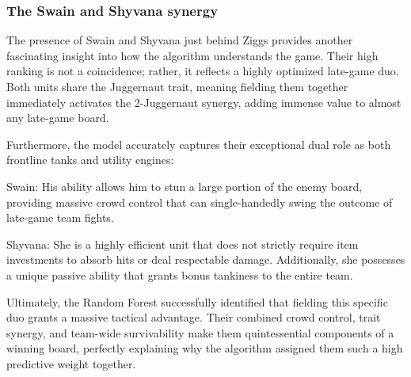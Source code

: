 \documentclass[12pt,a4paper]{extarticle}
\begin{document}
\subsubsection{The Swain and Shyvana synergy}
The presence of Swain and Shyvana just behind Ziggs provides another fascinating insight into how the algorithm understands the game. Their high ranking is not a coincidence; rather, it reflects a highly optimized late-game duo. Both units share the Juggernaut trait, meaning fielding them together immediately activates the 2-Juggernaut synergy, adding immense value to almost any late-game board.

Furthermore, the model accurately captures their exceptional dual role as both frontline tanks and utility engines:

Swain: His ability allows him to stun a large portion of the enemy board, providing massive crowd control that can single-handedly swing the outcome of late-game team fights.

Shyvana: She is a highly efficient unit that does not strictly require item investments to absorb hits or deal respectable damage. Additionally, she possesses a unique passive ability that grants bonus tankiness to the entire team.

Ultimately, the Random Forest successfully identified that fielding this specific duo grants a massive tactical advantage. Their combined crowd control, trait synergy, and team-wide survivability make them quintessential components of a winning board, perfectly explaining why the algorithm assigned them such a high predictive weight together.
\end{document}
